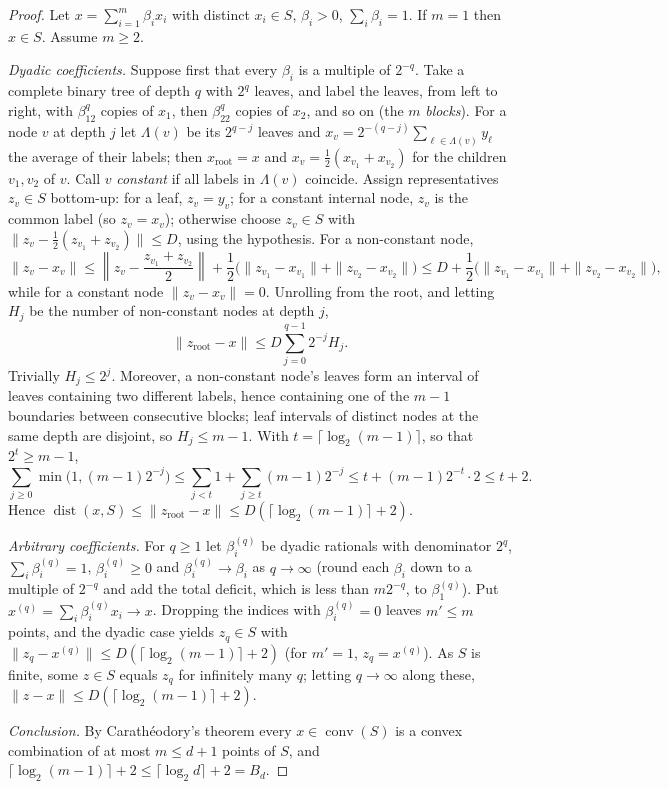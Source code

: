 \documentclass[11pt,a4paper]{article}
\theoremstyle{plain}
\theoremstyle{definition}
\theoremstyle{remark}
\newcommand{\conv}{\operatorname{conv}}
\newcommand{\dist}{\operatorname{dist}}
\newcommand{\norm}[1]{\left\|#1\right\|}
\begin{document}
\label{pf:dyadic}
\lemdyadic*
\begin{proof}
Let $x=\sum_{i=1}^m\beta_ix_i$ with distinct $x_i\in S$, $\beta_i>0$, $\sum_i\beta_i=1$. If $m=1$ then $x\in S$. Assume $m\ge2$.

\emph{Dyadic coefficients.} Suppose first that every $\beta_i$ is a multiple of $2^{-q}$. Take a complete binary tree of depth $q$ with $2^q$ leaves, and label the leaves, from left to right, with $\beta_12^q$ copies of $x_1$, then $\beta_22^q$ copies of $x_2$, and so on (the $m$ \emph{blocks}). For a node $v$ at depth $j$ let $\Lambda(v)$ be its $2^{q-j}$ leaves and $x_v=2^{-(q-j)}\sum_{\ell\in\Lambda(v)}y_\ell$ the average of their labels; then $x_{\text{root}}=x$ and $x_v=\frac12(x_{v_1}+x_{v_2})$ for the children $v_1,v_2$ of $v$. Call $v$ \emph{constant} if all labels in $\Lambda(v)$ coincide. Assign representatives $z_v\in S$ bottom-up: for a leaf, $z_v=y_v$; for a constant internal node, $z_v$ is the common label (so $z_v=x_v$); otherwise choose $z_v\in S$ with $\|z_v-\frac12(z_{v_1}+z_{v_2})\|\le D$, using the hypothesis. For a non-constant node,
\[
 \|z_v-x_v\|\le\norm{z_v-\frac{z_{v_1}+z_{v_2}}2}+\frac12\bigl(\|z_{v_1}-x_{v_1}\|+\|z_{v_2}-x_{v_2}\|\bigr)\le D+\frac12\bigl(\|z_{v_1}-x_{v_1}\|+\|z_{v_2}-x_{v_2}\|\bigr),
\]
while for a constant node $\|z_v-x_v\|=0$. Unrolling from the root, and letting $H_j$ be the number of non-constant nodes at depth $j$,
\[
 \|z_{\text{root}}-x\|\le D\sum_{j=0}^{q-1}2^{-j}H_j .
\]
Trivially $H_j\le2^j$. Moreover, a non-constant node's leaves form an interval of leaves containing two different labels, hence containing one of the $m-1$ boundaries between consecutive blocks; leaf intervals of distinct nodes at the same depth are disjoint, so $H_j\le m-1$. With $t=\lceil\log_2(m-1)\rceil$, so that $2^t\ge m-1$,
\[
 \sum_{j\ge0}\min\bigl(1,(m-1)2^{-j}\bigr)\le\sum_{j<t}1+\sum_{j\ge t}(m-1)2^{-j}\le t+(m-1)2^{-t}\cdot2\le t+2 .
\]
Hence $\dist(x,S)\le\|z_{\text{root}}-x\|\le D(\lceil\log_2(m-1)\rceil+2)$.

\emph{Arbitrary coefficients.} For $q\ge1$ let $\beta^{(q)}_i$ be dyadic rationals with denominator $2^q$, $\sum_i\beta_i^{(q)}=1$, $\beta^{(q)}_i\ge0$ and $\beta^{(q)}_i\to\beta_i$ as $q\to\infty$ (round each $\beta_i$ down to a multiple of $2^{-q}$ and add the total deficit, which is less than $m2^{-q}$, to $\beta^{(q)}_1$). Put $x^{(q)}=\sum_i\beta^{(q)}_ix_i\to x$. Dropping the indices with $\beta_i^{(q)}=0$ leaves $m'\le m$ points, and the dyadic case yields $z_q\in S$ with $\|z_q-x^{(q)}\|\le D(\lceil\log_2(m-1)\rceil+2)$ (for $m'=1$, $z_q=x^{(q)}$). As $S$ is finite, some $z\in S$ equals $z_q$ for infinitely many $q$; letting $q\to\infty$ along these, $\|z-x\|\le D(\lceil\log_2(m-1)\rceil+2)$.

\emph{Conclusion.} By Carathéodory's theorem every $x\in\conv(S)$ is a convex combination of at most $m\le d+1$ points of $S$, and $\lceil\log_2(m-1)\rceil+2\le\lceil\log_2d\rceil+2=B_d$.
\end{proof}
\end{document}
